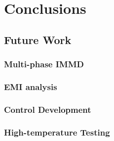 \chapter{Conclusions}

\section{Future Work}

\subsection{Multi-phase IMMD}

\subsection{EMI analysis}

\subsection{Control Development}

\subsection{High-temperature Testing}
